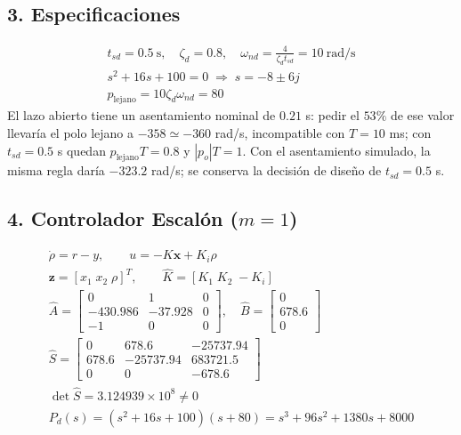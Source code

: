 \documentclass[11pt]{article}
\begin{document}
\subsection*{3. Especificaciones}
\begin{gather*}
t_{sd}=0.5~\text{s},\quad\zeta_d=0.8,\quad\omega_{nd}=\frac{4}{\zeta_dt_{sd}}=10~\text{rad/s}\\
s^{2} + 16s + 100=0\;\Rightarrow\;s=-8\pm 6j\\
p_{\text{lejano}}=10\zeta_d\omega_{nd}=80
\end{gather*}
El lazo abierto tiene un asentamiento nominal de $0.21$ s: pedir el $53\%$ de ese valor llevaría el polo lejano a $-358\simeq-360$ rad/s, incompatible con $T=10$ ms; con $t_{sd}=0.5$ s quedan $p_{\text{lejano}}T=0.8$ y $|p_o|T=1$.
Con el asentamiento simulado, la misma regla daría $-323.2$ rad/s; se conserva la decisión de diseño de $t_{sd}=0.5$ s.
\subsection*{4. Controlador Escalón ($m=1$)}
\begin{gather*}
\dot\rho=r-y,\qquad u=-K\mathbf x+K_i\rho\\
\mathbf z=[x_1\;x_2\;\rho]^T,\qquad\hat K=[K_1\;K_2\;-K_i]\\
\hat A=\begin{bmatrix}0 & 1 & 0 \\ -430.986 & -37.928 & 0 \\ -1 & 0 & 0\end{bmatrix},\quad\hat B=\begin{bmatrix}0 \\ 678.6 \\ 0\end{bmatrix}\\
\hat S=\begin{bmatrix}0 & 678.6 & -25737.94 \\ 678.6 & -25737.94 & 683721.5 \\ 0 & 0 & -678.6\end{bmatrix}\\
\det\hat S=3.124939\times10^{8}\ne0\\
P_d(s)=(s^{2} + 16s + 100)(s+80)=s^{3} + 96s^{2} + 1380s + 8000
\end{gather*}
\end{document}
